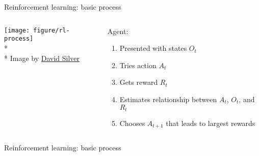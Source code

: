 \documentclass{beamer}
\begin{document}
\begin{frame}[c]{Reinforcement learning: basic process}
\begin{columns}%
  \begin{column}{0.54\textwidth}
        \centering
    \texttt{[image: figure/rl-process]} \\*
        \vspace{-6pt}
        \hrulefill \\*
        \vspace{-6pt}
        {\scriptsize Image by \href{http://www0.cs.ucl.ac.uk/staff/D.Silver/web/Teaching.html}{David Silver}}
  \end{column}
  \begin{column}{0.5\textwidth}
    Agent:
    \begin{enumerate}[<+->]
      \item Presented with states $O_{t}$
      \item Tries action $A_{t}$
      \item Gets reward $R_{t}$
      \item Estimates relationship between $A_{t}$, $O_{t}$, and $R_{t}$
      \item Chooses $A_{t+1}$ that leads to largest rewards
    \end{enumerate}
  \end{column}
\end{columns}
\end{frame}

%
%
%


\begin{frame}[t]{Reinforcement learning: basic process}

\end{frame}
\end{document}
